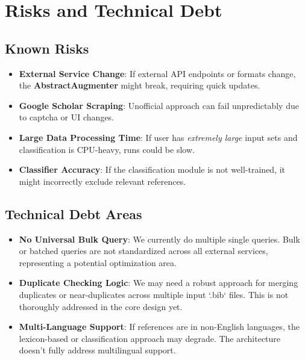 \documentclass[12pt]{article}
\begin{document}
\section{Risks and Technical Debt}

\subsection{Known Risks}
\begin{itemize}
  \item \textbf{External Service Change}: If external API endpoints or formats change, the \textbf{AbstractAugmenter} might break, requiring quick updates. 
  \item \textbf{Google Scholar Scraping}: Unofficial approach can fail unpredictably due to captcha or UI changes.
  \item \textbf{Large Data Processing Time}: If user has \emph{extremely large} input sets and classification is CPU-heavy, runs could be slow. 
  \item \textbf{Classifier Accuracy}: If the classification module is not well-trained, it might incorrectly exclude relevant references.
\end{itemize}

\subsection{Technical Debt Areas}
\begin{itemize}
  \item \textbf{No Universal Bulk Query}: We currently do multiple single queries. Bulk or batched queries are not standardized across all external services, representing a potential optimization area.
  \item \textbf{Duplicate Checking Logic}: We may need a robust approach for merging duplicates or near-duplicates across multiple input `.bib` files. This is not thoroughly addressed in the core design yet.
  \item \textbf{Multi-Language Support}: If references are in non-English languages, the lexicon-based or classification approach may degrade. The architecture doesn’t fully address multilingual support.
\end{itemize}

\end{document}
